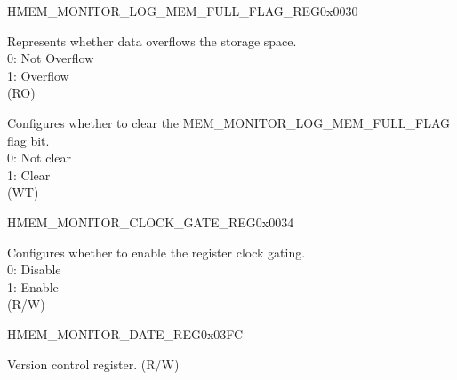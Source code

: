 \begin{register}{H}{MEM\_MONITOR\_LOG\_MEM\_FULL\_FLAG\_REG}{0x0030}\label{regdesc:MEMMONITORLOGMEMFULLFLAGREG}
%
%
%
\regnewline%
\begin{regdesc}\begin{reglist}
\label{fielddesc:MEMMONITORLOGMEMFULLFLAG}\item [MEM\_MONITOR\_LOG\_MEM\_FULL\_FLAG] Represents whether data overflows the storage space.\\
0: Not Overflow\\
1: Overflow\\ (RO)
\label{fielddesc:MEMMONITORCLRLOGMEMFULLFLAG}\item [MEM\_MONITOR\_CLR\_LOG\_MEM\_FULL\_FLAG] Configures whether to clear the  MEM\_MONITOR\_LOG\_MEM\_FULL\_FLAG flag bit.\\
0: Not clear \\
1: Clear\\ (WT)
\end{reglist}\end{regdesc}
\end{register}


\begin{register}{H}{MEM\_MONITOR\_CLOCK\_GATE\_REG}{0x0034}\label{regdesc:MEMMONITORCLOCKGATEREG}
%
%
\regnewline%
\begin{regdesc}\begin{reglist}
\label{fielddesc:MEMMONITORCLKEN}\item [MEM\_MONITOR\_CLK\_EN] Configures whether to enable the register clock gating.\\
0: Disable\\
1: Enable\\ (R/W)
\end{reglist}\end{regdesc}
\end{register}


\begin{register}{H}{MEM\_MONITOR\_DATE\_REG}{0x03FC}\label{regdesc:MEMMONITORDATEREG}
%
%
\regnewline%
\begin{regdesc}\begin{reglist}
\label{fielddesc:MEMMONITORDATE}\item [MEM\_MONITOR\_DATE] Version control register. (R/W)
\end{reglist}\end{regdesc}
\end{register}
